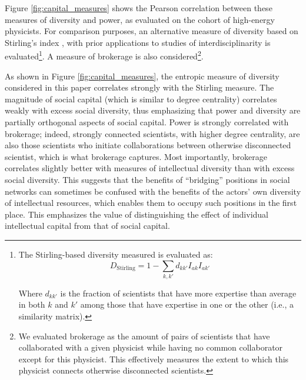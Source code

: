 \documentclass{article}
\begin{document}
Figure \ref{fig:capital_measures} shows the Pearson correlation between these measures of diversity and power, as evaluated on the cohort of high-energy physicists. For comparison purposes, an alternative measure of diversity based on Stirling's index \citep{Stirling2007}, with prior applications to studies of interdisciplinarity \citep{Porter2007,Leahey2016} is evaluated\footnote{The Stirling-based diversity measured is evaluated as: \begin{equation}
    D_{\text{Stirling}} = 1-\sum_{k,k'}d_{kk'}I_{ak}I_{ak'}
\end{equation}

Where $d_{kk'}$ is the fraction of scientists that have more expertise than average in both $k$ and $k'$ among those that have expertise in one or the other (i.e., a similarity matrix).}. A measure of brokerage is also considered\footnote{We evaluated brokerage as the amount of pairs of scientists that have collaborated with a given physicist while having no common collaborator except for this physicist. This effectively measures the extent to which this physicist connects otherwise disconnected scientists.}. 

As shown in Figure \ref{fig:capital_measures}, the entropic measure of diversity considered in this paper correlates strongly with the Stirling measure. The magnitude of social capital (which is similar to degree centrality) correlates weakly with excess social diversity, thus emphasizing that power and diversity are partially orthogonal aspects of social capital. Power is strongly correlated with brokerage; indeed, strongly connected scientists, with higher degree centrality, are also those scientists who initiate collaborations between otherwise disconnected scientist, which is what brokerage captures. Most importantly, brokerage correlates slightly better with measures of intellectual diversity than with excess social diversity. This suggests that the benefits of ``bridging'' positions in social networks can sometimes be confused with the benefits of the actors' own diversity of intellectual resources, which enables them to occupy such positions in the first place. This emphasizes the value of distinguishing the effect of individual intellectual capital from that of social capital. %
\end{document}
